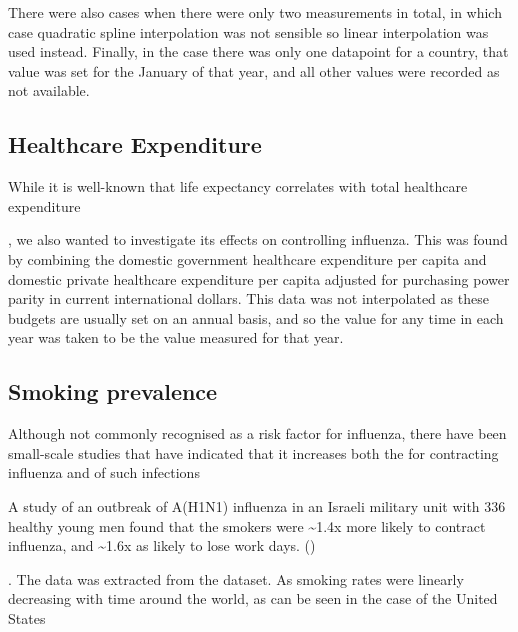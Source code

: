 \documentclass[letterpaper,10pt,english]{sphinxmanual}
\begin{document}
There were also cases when there were only two measurements in total, in which case quadratic spline interpolation was not sensible so linear interpolation was used instead. Finally, in the case there was only one datapoint for a country, that value was set for the January of that year, and all other values were recorded as not available.


\subsection{Healthcare Expenditure}
\label{\detokenize{datasets:healthcare-expenditure}}
While it is well-known that life expectancy correlates with total healthcare expenditure %
\begin{footnote}[3]\sphinxAtStartFootnote
{}
%
\end{footnote}, we also wanted to investigate its effects on controlling influenza. This was found by combining the domestic government healthcare expenditure per capita and domestic private healthcare expenditure per capita adjusted for purchasing power parity in current international dollars. This data was not interpolated as these budgets are usually set on an annual basis, and so the value for any time in each year was taken to be the value measured for that year.


\subsection{Smoking prevalence}
\label{\detokenize{datasets:smoking-prevalence}}
Although not commonly recognised as a risk factor for influenza, there have been small-scale studies that have indicated that it increases both the  for contracting influenza and  of such infections %
\begin{footnote}[4]\sphinxAtStartFootnote
A study of an outbreak of A(H1N1) influenza in an Israeli military unit with 336 healthy young men found that the smokers were \textasciitilde{}1.4x more likely to contract influenza, and \textasciitilde{}1.6x as likely to lose work days. ()
%
\end{footnote}. The data was extracted from the  dataset. As smoking rates were linearly decreasing with time around the world, as can be seen in the case of the United States
\end{document}
